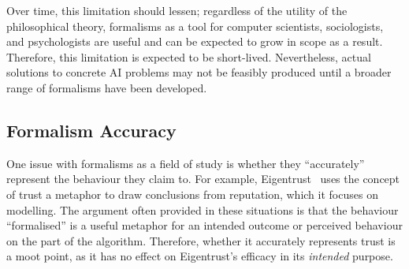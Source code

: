 Over time, this limitation should lessen; regardless of the utility of the philosophical theory, formalisms as a tool for computer scientists, sociologists, and psychologists are useful and can be expected to grow in scope as a result. Therefore, this limitation is expected to be short-lived. Nevertheless, actual solutions to concrete AI problems may not be feasibly produced until a broader range of formalisms have been developed.\par

% 

\subsection{Formalism Accuracy}
One issue with formalisms as a field of study is whether they ``accurately'' represent the behaviour they claim to. For example, Eigentrust~\citep{eigentrust} uses the concept of trust a metaphor to draw conclusions from reputation, which it focuses on modelling. The argument often provided in these situations is that the behaviour ``formalised'' is a useful metaphor for an intended outcome or perceived behaviour on the part of the algorithm. Therefore, whether it accurately represents trust is a moot point, as it has no effect on Eigentrust's efficacy in its \emph{intended} purpose.\par

